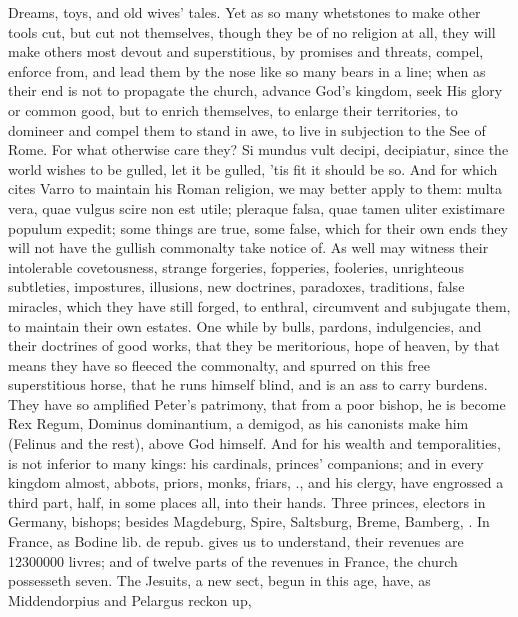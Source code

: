 {Dreams, toys, and old wives' tales. Yet as so many whetstones to
make other tools cut, but cut not themselves, though they be of no
religion at all, they will make others most devout and superstitious,
by promises and threats, compel, enforce from, and lead them by the
nose like so many bears in a line; when as their end is not to
propagate the church, advance God's kingdom, seek His glory or common
good, but to enrich themselves, to enlarge their territories, to
domineer and compel them to stand in awe, to live in subjection to the
See of Rome. For what otherwise care they? Si mundus vult decipi,
decipiatur, since the world wishes to be gulled, let it be gulled, 'tis
fit it should be so. And for which \Austin{} cites Varro to maintain
his Roman religion, we may better apply to them: multa vera, quae
vulgus scire non est utile; pleraque falsa, quae tamen uliter
existimare populum expedit; some things are true, some false, which for
their own ends they will not have the gullish commonalty take notice
of. As well may witness their intolerable covetousness, strange
forgeries, fopperies, fooleries, unrighteous subtleties, impostures,
illusions, new doctrines, paradoxes, traditions, false miracles, which
they have still forged, to enthral, circumvent and subjugate them, to
maintain their own estates. One while by bulls, pardons,
indulgencies, and their doctrines of good works, that they be
meritorious, hope of heaven, by that means they have so fleeced the
commonalty, and spurred on this free superstitious horse, that he runs
himself blind, and is an ass to carry burdens. They have so amplified
Peter's patrimony, that from a poor bishop, he is become Rex Regum,
Dominus dominantium, a demigod, as his canonists make him (Felinus and
the rest), above God himself. And for his wealth and 
temporalities, is not inferior to many kings: his cardinals,
princes' companions; and in every kingdom almost, abbots, priors,
monks, friars, \etc{}., and his clergy, have engrossed a third part,
half, in some places all, into their hands. Three princes, electors in
Germany, bishops; besides Magdeburg, Spire, Saltsburg, Breme, Bamberg,
\etc{}. In France, as Bodine lib. de repub. gives us to understand, their
revenues are 12\thinspace{}300\thinspace{}000 livres; and of twelve parts of the revenues in
France, the church possesseth seven. The Jesuits, a new sect, begun in
this age, have, as Middendorpius and Pelargus reckon up,
}
